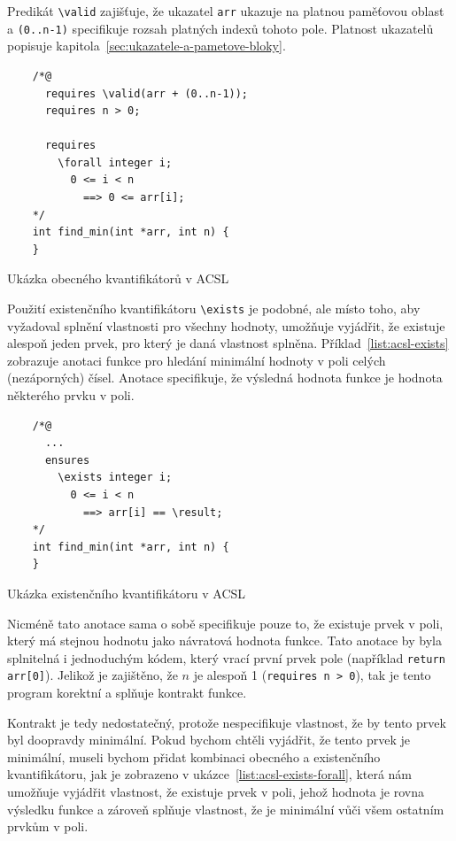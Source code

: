 Predikát \texttt{\textbackslash valid} zajišťuje,
že ukazatel \texttt{arr} ukazuje na platnou paměťovou oblast
a \texttt{(0..n-1)} specifikuje rozsah platných indexů tohoto pole.
Platnost ukazatelů popisuje kapitola~\ref{sec:ukazatele-a-pametove-bloky}.

\begin{listing}[H]
    \begin{verbatim}
    /*@
      requires \valid(arr + (0..n-1));
      requires n > 0;

      requires
        \forall integer i;
          0 <= i < n
            ==> 0 <= arr[i];
    */
    int find_min(int *arr, int n) {
    }
    \end{verbatim}
    \caption{Ukázka obecného kvantifikátorů v ACSL}
    \label{list:acsl-forall}
\end{listing}


Použití existenčního kvantifikátoru \texttt{\textbackslash exists} je podobné,
ale místo toho, aby vyžadoval splnění vlastnosti pro všechny hodnoty,
umožňuje vyjádřit, že existuje alespoň jeden prvek, pro který je daná vlastnost splněna.
Příklad~\ref{list:acsl-exists} zobrazuje anotaci funkce pro hledání minimální hodnoty v poli celých (nezáporných) čísel.
Anotace specifikuje, že výsledná hodnota funkce je hodnota některého prvku v poli.

\begin{listing}[H]
    \begin{verbatim}
    /*@
      ...
      ensures
        \exists integer i;
          0 <= i < n
            ==> arr[i] == \result;
    */
    int find_min(int *arr, int n) {
    }
    \end{verbatim}
    \caption{Ukázka existenčního kvantifikátoru v ACSL}
    \label{list:acsl-exists}
\end{listing}

Nicméně tato anotace sama o sobě specifikuje pouze to, že existuje prvek v poli,
který má stejnou hodnotu jako návratová hodnota funkce.
Tato anotace by byla splnitelná i jednoduchým kódem, který vrací první prvek pole (například \texttt{return arr[0]}).
Jelikož je zajištěno, že $n$ je alespoň 1 (\texttt{requires~n~>~0}),
tak je tento program korektní a splňuje kontrakt funkce.



Kontrakt je tedy nedostatečný, protože nespecifikuje vlastnost,
že by tento prvek byl doopravdy minimální.
Pokud bychom chtěli vyjádřit, že tento prvek je minimální,
museli bychom přidat kombinaci obecného a existenčního kvantifikátoru,
jak je zobrazeno v ukázce~\ref{list:acsl-exists-forall},
která nám umožňuje vyjádřit vlastnost, že existuje prvek v poli,
jehož hodnota je rovna výsledku funkce a zároveň splňuje vlastnost,
že je minimální vůči všem ostatním prvkům v poli.

